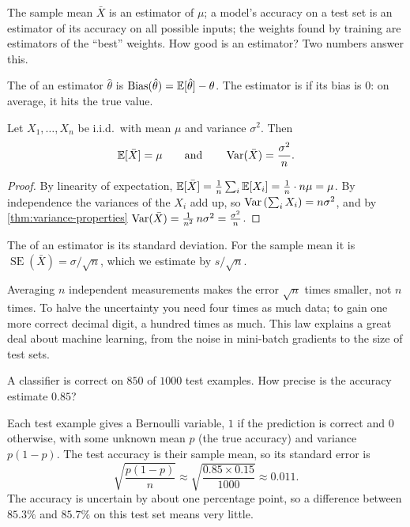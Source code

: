 The sample mean $\bar X$ is an estimator of $\mu$; a model's accuracy on a test
set is an estimator of its accuracy on all possible inputs; the weights found by
training are estimators of the ``best'' weights. How good is an estimator? Two
numbers answer this.

\begin{definition}\label{def:bias}
The  of an estimator $\hat\theta$ is
$\operatorname{Bias}(\hat\theta) = \mathbb{E}[\hat\theta] - \theta$. The estimator is
 if its bias is $0$: on average, it hits the
true value.
\end{definition}

\begin{theorem}\label{thm:sample-mean}
Let $X_1, \dots, X_n$ be i.i.d.\ with mean $\mu$ and variance $\sigma^2$. Then
\[
  \mathbb{E}[\bar X] = \mu
  \qquad\text{and}\qquad
  \operatorname{Var}(\bar X) = \frac{\sigma^2}{n} .
\]
\end{theorem}

\begin{proof}
By linearity of expectation, $\mathbb{E}[\bar X] = \frac1n\sum_i\mathbb{E}[X_i] = \frac1n\cdot
n\mu = \mu$. By independence the variances of the $X_i$ add up, so
$\operatorname{Var}\left(\sum_iX_i\right) = n\sigma^2$, and by \cref{thm:variance-properties}
$\operatorname{Var}(\bar X) = \frac{1}{n^2}\,n\sigma^2 = \frac{\sigma^2}{n}$.
\end{proof}

\begin{definition}\label{def:standard-error}
The  of an estimator is its standard deviation. For the
sample mean it is $\operatorname{SE}(\bar X) = \sigma/\sqrt n$, which we
estimate by $s/\sqrt n$.
\end{definition}

\begin{intuition}
Averaging $n$ independent measurements makes the error $\sqrt n$ times smaller,
not $n$ times. To halve the uncertainty you need four times as much data; to
gain one more correct decimal digit, a hundred times as much. This law explains
a great deal about machine learning, from the noise in mini-batch gradients to
the size of test sets.
\end{intuition}

\begin{example}\label{ex:accuracy-se}
A classifier is correct on $850$ of $1000$ test examples. How precise is the
accuracy estimate $0.85$?

\sol Each test example gives a Bernoulli variable, $1$ if the prediction is
correct and $0$ otherwise, with some unknown mean $p$ (the true accuracy) and
variance $p(1 - p)$. The test accuracy is their sample mean, so its standard
error is
\[
  \sqrt{\frac{p(1 - p)}{n}} \approx \sqrt{\frac{0.85\times0.15}{1000}}
  \approx 0.011 .
\]
The accuracy is uncertain by about one percentage point, so a difference
between $85.3\%$ and $85.7\%$ on this test set means very little.
\end{example}

